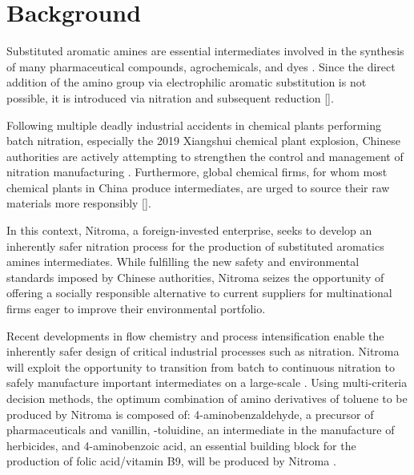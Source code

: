 \section{Background}

Substituted aromatic amines are essential intermediates involved in the synthesis of many pharmaceutical compounds, agrochemicals, and dyes \cite{vogt_amines_2000}. Since the direct addition of the amino group via electrophilic aromatic substitution is not possible, it is introduced via nitration and subsequent reduction []. 

Following multiple deadly industrial accidents in chemical plants performing batch nitration, especially the 2019 Xiangshui chemical plant explosion, Chinese authorities are actively attempting to strengthen the control and management of nitration manufacturing \cite{el_diario_china_2019}. Furthermore, global chemical firms, for whom most chemical plants in China produce intermediates, are urged to source their raw materials more responsibly [].


In this context, Nitroma, a foreign-invested enterprise, seeks to develop an inherently safer nitration process for the production of substituted aromatics amines intermediates. While fulfilling the new safety and environmental standards imposed by Chinese authorities, Nitroma seizes the opportunity of offering a socially responsible alternative to current suppliers for multinational firms eager to improve their environmental portfolio. 

Recent developments in flow chemistry and process intensification enable the inherently safer design of critical industrial processes such as nitration. Nitroma will exploit the opportunity to transition from batch to continuous nitration to safely manufacture important intermediates on a large-scale \cite{di_miceli_raimondi_safety_2015}. Using multi-criteria decision methods, the optimum combination of amino derivatives of toluene to be produced by Nitroma is composed of: 4-aminobenzaldehyde, a precursor of pharmaceuticals and vanillin, \ortho-toluidine, an intermediate in the manufacture of herbicides, and 4-aminobenzoic acid, an essential building block for the production of folic acid/vitamin B9, will be produced by Nitroma \cite{bowers_toluidines_2000,bruhne_benzaldehyde_2011,maki_benzoic_2000}.

